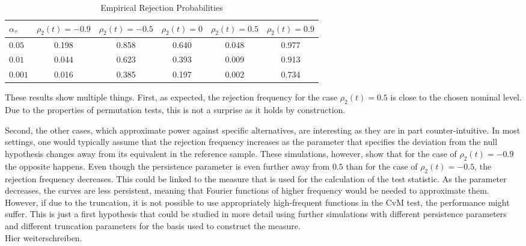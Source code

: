 \documentclass[12pt, a4paper]{article}
\theoremstyle{MAstyle} \newtheorem{assumption}{Assumption}[section]
\theoremstyle{MAstyle} \newtheorem{definition}{Definition}[section]
\theoremstyle{MAstyle} \newtheorem{theorem}{Theorem}[section]
\begin{document}
		\begin{table}[H]
			\centering
			\begin{tabular}{l|ccccc}\toprule
				$\alpha_{\tau}$ &$\rho_2(t) = -0.9$ &$\rho_2(t) = -0.5$ &$\rho_2(t) = 0$ &$\rho_2(t) = 0.5$ &$\rho_2(t) = 0.9$\\
				\midrule
				$0.05$	& 0.198 & 0.858  &  0.640 & 0.048   & 0.977  \\
				$0.01$ 	& 0.044	& 0.623  &  0.393 & 0.009   & 0.913  \\
				$0.001$	& 0.016	& 0.385  &  0.197 & 0.002   & 0.734  \\
				\bottomrule
			\end{tabular}
			\caption{Empirical Rejection Probabilities}
			\label{rej_probs_cor}
		\end{table}
		These results show multiple things. First, as expected, the rejection frequency for the case $\rho_2(t) = 0.5$ is close to the chosen nominal level. Due to the properties of permutation tests, this is not a surprise as it holds by construction. 
		
		Second, the other cases, which approximate power against specific alternatives, are interesting as they are in part counter-intuitive.		
		In most settings, one would typically assume that the rejection frequency increases as the parameter that specifies the deviation from the null hypothesis changes away from its equivalent in the reference sample. These simulations, however, show that for the case of $\rho_2(t) = -0.9$ the opposite happens. Even though the persistence parameter is even further away from $0.5$ than for the case of $\rho_2(t) = -0.5$, the rejection frequency decreases. This could be linked to the measure that is used for the calculation of the test statistic. As the parameter decreases, the curves are less persistent, meaning that Fourier functions of higher frequency would be needed to approximate them. However, if due to the truncation, it is not possible to use appropriately high-frequent functions in the CvM test, the performance might suffer. This is just a first hypothesis that could be studied in more detail using further simulations with different persistence parameters and different truncation parameters for the basis used to construct the measure.\\
		
		{\color{red} Hier weiterschreiben.}
				
\end{document}
